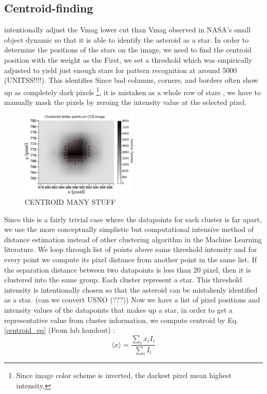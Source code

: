 \documentclass[authoryear, 12pt,5p, times]{elsarticle}
\begin{document}
\subsection{Centroid-finding}
\label{centroid_find}
intentionally adjust the Vmag lower cut than Vmag observed in NASA's small object dynamic so that it is able to identify the asteroid as a star.
In order to determine the positions of the stars on the image, we need to find the centroid position with the weight as the 
First, we set a threshold which was empirically adjusted to yield just enough stars for pattern recognition at around 5000 (UNITSS!!!!). This identifies 
Since bad columns, corners, and borders often show up as completely dark pixels \footnote{Since image color scheme is inverted, the darkest pixel mean highest intensity.}, it is mistaken as a whole row of stars , we have to manually mask the pixels by zeroing the intensity value at the selected pixel.
	\begin{figure}[h!]
\includegraphics[width=0.5\textwidth]{figures/centroid_many}
\caption{CENTROID MANY STUFF}
\label{centroid_many}
\end{figure}
Since this is a fairly trivial case where the datapoints for each cluster is far apart, we use the more conceptually simplistic but computational intensive method of distance estimation instead of other clustering algorithm in the Machine Learning literature.  We loop through list of points above same threshold intensity and for every point we compute its pixel distance from another point in the same list. If the separation distance between two datapoints is less than 20 pixel, then it is clustered into the same group. Each cluster represent a star. This threshold intensity is intentionally chosen so that the asteroid can be mistakenly identified as a star. (can we convert USNO (???)) Now we have a list of pixel positions and intensity values of the datapoints that makes up a star, in order to get a representative value from cluster information, we compute centroid by Eq. \ref{centroid_eq} (From lab handout) :
\begin{equation}
\langle x\rangle = \frac{\sum \limits_{i} x_i I_i}{\sum\limits_{i} I_i}
\label{centroid_eq}
\end{equation}
\end{document}
